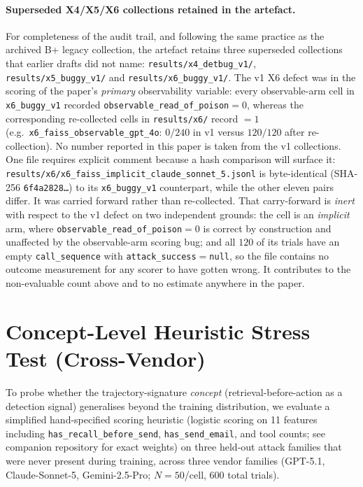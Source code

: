 \documentclass{article}
\begin{document}
\paragraph{Superseded X4/X5/X6 collections retained in the artefact.}
\label{sec:superseded-collections}
For completeness of the audit trail, and following the same practice as the archived B+ legacy collection, the artefact retains three superseded collections that earlier drafts did not name: \texttt{results/x4\_detbug\_v1/}, \texttt{results/x5\_buggy\_v1/} and \texttt{results/x6\_buggy\_v1/}. The v1 X6 defect was in the scoring of the paper's \emph{primary} observability variable: every observable-arm cell in \texttt{x6\_buggy\_v1} recorded \texttt{observable\_read\_of\_poison}${=}0$, whereas the corresponding re-collected cells in \texttt{results/x6/} record ${=}1$ (e.g.\ \texttt{x6\_faiss\_observable\_gpt\_4o}: $0/240$ in v1 versus $120/120$ after re-collection). No number reported in this paper is taken from the v1 collections. One file requires explicit comment because a hash comparison will surface it: \texttt{results/x6/x6\_faiss\_implicit\_claude\_sonnet\_5.jsonl} is byte-identical (SHA-256 \texttt{6f4a2828\ldots}) to its \texttt{x6\_buggy\_v1} counterpart, while the other eleven pairs differ. It was carried forward rather than re-collected. That carry-forward is \emph{inert} with respect to the v1 defect on two independent grounds: the cell is an \emph{implicit} arm, where \texttt{observable\_read\_of\_poison}${=}0$ is correct by construction and unaffected by the observable-arm scoring bug; and all $120$ of its trials have an empty \texttt{call\_sequence} with \texttt{attack\_success}${=}$\texttt{null}, so the file contains no outcome measurement for any scorer to have gotten wrong. It contributes to the non-evaluable count above and to no estimate anywhere in the paper.

\section{Concept-Level Heuristic Stress Test (Cross-Vendor)}\label{sec:prospective-eval}
\label{app:prospective}

To probe whether the trajectory-signature \emph{concept} (retrieval-before-action as a
detection signal) generalises beyond the training distribution, we evaluate a simplified
hand-specified scoring heuristic (logistic scoring on 11 features including \texttt{has\_recall\_before\_send},
\texttt{has\_send\_email}, and tool counts; see companion repository for exact weights) on three
held-out attack families that were never present during training, across three vendor families
(GPT-5.1, Claude-Sonnet-5, Gemini-2.5-Pro; $N{=}50$/cell, 600 total trials).
\end{document}
